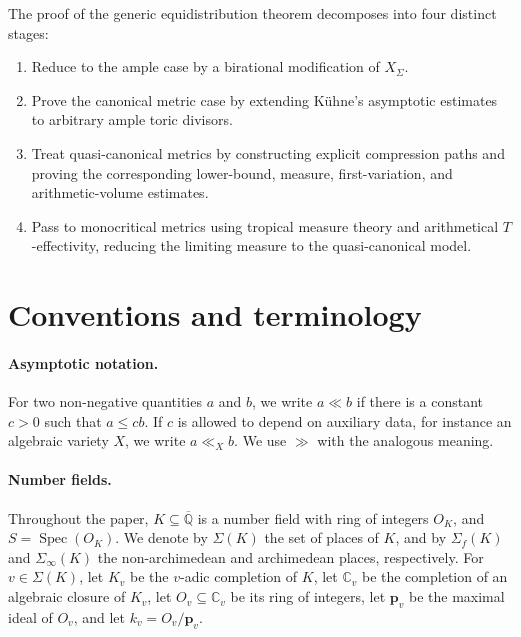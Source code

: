 \documentclass[10pt,a4paper]{amsart}
\theoremstyle{plain}
\theoremstyle{plain}
\numberwithin{equation}{section}
\begin{document}
The proof of the generic equidistribution theorem decomposes into four
distinct stages:
\begin{enumerate}[label=\textup{(\arabic*)},leftmargin=2em]
	\item Reduce to the ample case by a birational modification of \(X_\Sigma\).
	\item Prove the canonical metric case by extending K\"uhne's asymptotic
	estimates to arbitrary ample toric divisors.
	\item Treat quasi-canonical metrics by constructing explicit compression paths
	and proving the corresponding lower-bound, measure, first-variation, and
	arithmetic-volume estimates.
	\item Pass to monocritical metrics using tropical measure theory and
	arithmetical \(T\)-effectivity, reducing the limiting measure to the
	quasi-canonical model.
\end{enumerate}






\section{Conventions and terminology}
\paragraph{Asymptotic notation.}
For two non-negative quantities \(a\) and \(b\), we write \(a\ll b\) if
there is a constant \(c>0\) such that \(a\leq cb\).  If \(c\) is allowed to
depend on auxiliary data, for instance an algebraic variety \(X\), we write
\(a\ll_X b\).  We use \(\gg\) with the analogous meaning.

\paragraph{Number fields.}
Throughout the paper, \(K\subseteq \overline{\mathbb Q}\) is a number field
with ring of integers \(O_K\), and \(S=\operatorname{Spec}(O_K)\).  We denote
by \(\Sigma(K)\) the set of places of \(K\), and by \(\Sigma_f(K)\) and
\(\Sigma_{\infty}(K)\) the non-archimedean and archimedean places,
respectively.  For \(v\in\Sigma(K)\), let \(K_v\) be the \(v\)-adic
completion of \(K\), let \(\mathbb C_v\) be the completion of an algebraic
closure of \(K_v\), let \(O_v\subseteq\mathbb C_v\) be its ring of integers,
let \(\boldsymbol p_v\) be the maximal ideal of \(O_v\), and let
\(k_v=O_v/\boldsymbol p_v\).
\end{document}

